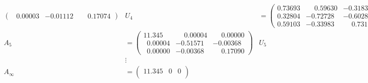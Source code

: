 \begin{beispiel}
\begin{align*}
\begin{pmatrix}
   \phantom{0}0.00003& -0.01112&  \phantom{-}0.17074
\end{pmatrix}&
U_4&=\begin{pmatrix}
   0.73693&  \phantom{-}0.59630& -0.31837\\
   0.32804& -0.72728& -0.60287\\
   0.59103& -0.33983&  \phantom{-}0.73157
\end{pmatrix}
\\
A_5&=\begin{pmatrix}
   11.345\phantom{00}&  \phantom{-}0.00004&  \phantom{-}0.00000\\
   \phantom{0}0.00004& -0.51571& -0.00368\\
   \phantom{0}0.00000& -0.00368&  \phantom{-}0.17090
\end{pmatrix}&
U_5&=\begin{pmatrix}
   0.73698& -0.58924& -0.33115\\
   0.32798&  0.74014& -0.58704\\
   0.59101&  0.32403&  0.73873
\end{pmatrix}
\\
&\vdots
&&\vdots
\\
A_\infty&=\begin{pmatrix}
   11.345& 0&0\\

\end{pmatrix}
\end{align*}
\end{beispiel}
